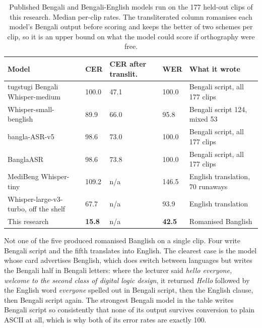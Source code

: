 \begin{table}[htbp]
\centering
\caption[Published Bengali models run on the 177 held-out clips]{Published Bengali and Bengali-English models run on the 177 held-out clips of
this research. Median per-clip rates. The transliterated column romanises each model's
Bengali output before scoring and keeps the better of two schemes per clip, so it is an
upper bound on what the model could score if orthography were free.}
\label{tab:baselines}
\small
\begin{tabular}{p{4.3cm}p{1.5cm}p{1.9cm}p{1.4cm}p{3.3cm}}
\toprule
Model & CER & CER after translit. & WER & What it wrote \\
\midrule
tugstugi Bengali Whisper-medium \cite{tugstugi2023bengaliasr} & 100.0 & 47.1 & 100.0 & Bengali script, all 177 clips \\
\addlinespace
Whisper-small-benglish \cite{bluepanther2024benglish} & 89.9 & 66.0 & 95.8 & Bengali script 124, mixed 53 \\
\addlinespace
bangla-ASR-v5 \cite{arif2024banglaasrv5} & 98.6 & 73.0 & 100.0 & Bengali script, all 177 clips \\
\addlinespace
BanglaASR \cite{banglaasr2023} & 98.6 & 73.8 & 100.0 & Bengali script, all 177 clips \\
\addlinespace
MediBeng Whisper-tiny \cite{ghosh2025medibeng} & 109.2 & n/a & 146.5 & English translation, 70 runaways \\
\addlinespace
Whisper-large-v3-turbo, off the shelf \cite{radford2023whisper} & 67.7 & n/a & 93.9 & English translation \\
\addlinespace
This research & \textbf{15.8} & n/a & \textbf{42.5} & Romanised Banglish \\
\bottomrule
\end{tabular}
\end{table}

Not one of the five produced romanised Banglish on a single clip. Four write Bengali
script and the fifth translates into English. The clearest case is the model whose card
advertises Benglish, which does switch between languages but writes the Bengali half in
Bengali letters: where the lecturer said \textit{hello everyone, welcome to the second
class of digital logic design}, it returned \textit{Hello} followed by the English word
\textit{everyone} spelled out in Bengali script, then the English clause, then Bengali
script again. The strongest Bengali model in the table writes Bengali script so
consistently that none of its output survives conversion to plain ASCII at all, which is
why both of its error rates are exactly 100.

